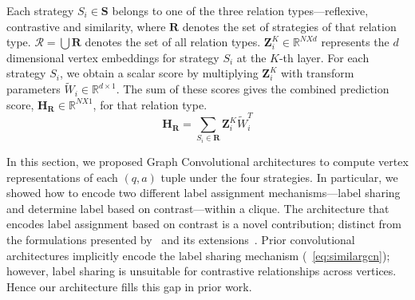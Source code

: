 \vspace{0.1in}
\noindent
Each strategy $S_i \in \mathbf{S}$ belongs to one of the three relation types---reflexive, contrastive and similarity, where $\mathbf{R}$ denotes the set of strategies of that relation type. $\mathcal{R} = \bigcup \mathbf{R}$ denotes the set of all relation types.
$\mathbf{Z}_i^K \in \mathbb{R}^{N X d}$ represents the $d$ dimensional vertex embeddings for strategy $S_i$ at the $K$-th layer. For each strategy $S_i$, we obtain a scalar score by multiplying $\mathbf{Z}_i^K$ with transform parameters $\widetilde{W}_i \in \mathbb{R}^{d \times 1}$.
The sum of these scores gives the combined prediction score, $\mathbf{H}_{\mathbf{R}} \in \mathbb{R}^{N X 1}$, for that relation type.
\begin{equation}
    \label{eq:score}
        \mathbf{H}_{\mathbf{R}} = \sum_{S_i \in \mathbf{R}} \mathbf{Z}_i^K \widetilde{W}_i^T
\end{equation}

In this section, we proposed Graph Convolutional architectures to compute vertex representations of each $(q,a)$ tuple under the four strategies.
In particular, we showed how to encode two different label assignment mechanisms---label sharing and determine label based on contrast---within a clique. The architecture that encodes label assignment based on contrast is a novel contribution; distinct from the formulations presented by~\citet{gcn} and its extensions~\cite{signedgcn, relationalGCN}. Prior convolutional architectures implicitly encode the label sharing mechanism (~\cref{eq:similargcn}); however, label sharing is unsuitable for contrastive relationships across vertices. Hence our architecture fills this gap in prior work.
